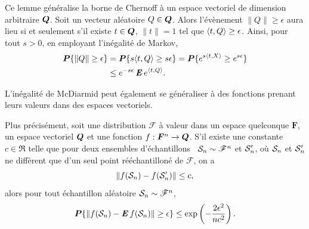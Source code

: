 \begin{lemme}
  \label{b:lem:chernoff}
  Ce lemme généralise la borne de Chernoff à un espace vectoriel de dimension arbitraire
  $\Q$. Soit un vecteur aléatoire $Q \in \Q$. Alors l'évènement $\|Q\| \geq \epsilon$ aura lieu si et
  seulement s'il existe $t \in \Q$, $\|t\|=1$ tel que $\inp{t,Q} \geq \epsilon$. Ainsi, pour tout
  $s>0$, en employant l'inégalité de Markov, 
  \begin{align}
    \pp\{\|Q\| \geq \epsilon\} &= \pp\{s\inp{t,Q} \geq s\epsilon\} = \pp\{e^{s\inp{t,X}} \geq e^{s\epsilon}\}\\
                     &\leq e^{-s\epsilon}\E e^{\inp{t,Q}}.
  \end{align}
\end{lemme}

\begin{conj}
  \label{b:lem:mcdiarmid}
  L'inégalité de McDiarmid peut également se généraliser à des fonctions prenant leurs
  valeurs dans des espaces vectoriels.%

  Plus précisément, soit une distribution $\mathscr{F}$ à valeur dans un espace quelconque
  $\bm F$, un espace vectoriel $\Q$ et une fonction $f:\bm F^n\to \Q$. S'il existe une
  constante $c\in\Re$ telle que pour deux ensembles d'échantillons \iid\
  $\S_n \sim \mathscr{F}^n$ et $\S'_n$, où $\S_n$ et $\S'_n$ ne diffèrent que d'un seul point
  rééchantilloné de $\mathscr{F}$, on a
  \begin{equation}
    \|f(\S_n) - f(\S'_n)\| \leq c,
  \end{equation}
  alors pour tout échantillon aléatoire $\S_n\sim\mathscr{F}^n$, 
  \begin{equation}
    \pp\{\|f(\S_n) - \E f(\S_n)\| \geq \epsilon\} \leq \exp\left(-\frac{2\epsilon^2}{nc^2}\right).
  \end{equation}
\end{conj}


